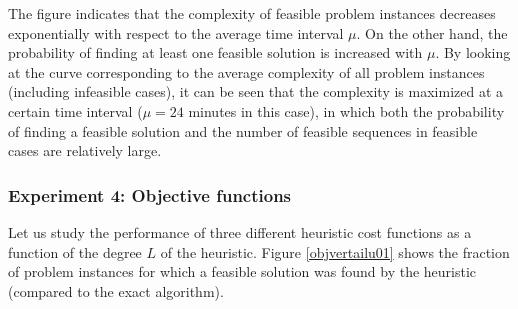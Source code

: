 \documentclass[dissertation,draft*]{aaltoseries}
\begin{document}
The figure indicates that the complexity of feasible problem instances decreases exponentially 
with respect to the average time interval $\mu$. On the other hand, the probability of finding
at least one feasible solution is increased with $\mu$. By looking at the curve corresponding 
to the average complexity of all problem instances (including infeasible cases), it can be seen that the
complexity is maximized at a certain time interval ($\mu = 24$ minutes in this case), in which both the probability of
finding a feasible solution and the number of feasible sequences in feasible cases are relatively large.






\subsubsection{Experiment 4: Objective functions}
Let us study the performance of three different heuristic cost functions %
as a function of the degree $L$ of the heuristic.
Figure \ref{objvertailu01} shows the fraction of problem instances for which a feasible solution was 
found by the heuristic (compared to the exact algorithm). 
\end{document}
